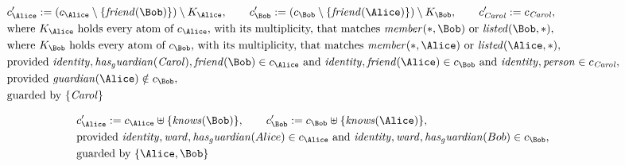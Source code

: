\begin{align*}
&
c'_
{
\Alice
}
 := 
(c_
{
\Alice
}
 \setminus 
\{
\mathit{
friend
}
(
\Bob
)
\}
) \setminus K_
{
\Alice
}
, \qquad 
c'_
{
\Bob
}
 := 
(c_
{
\Bob
}
 \setminus 
\{
\mathit{
friend
}
(
\Alice
)
\}
) \setminus K_
{
\Bob
}
, \qquad 
c'_
{
\mathit{Carol}
}
 := 
c_
{
\mathit{Carol}
}
,\\
&
\text{where } K_
{
\Alice
}
 \text{ holds every atom of } c_
{
\Alice
}
 \text{, with its multiplicity, that matches } 
\mathit{
member
}
(
\ast
,
\Bob
)
 \text{ or } 
\mathit{
listed
}
(
\Bob
,
\ast
)
,\\
&
\text{where } K_
{
\Bob
}
 \text{ holds every atom of } c_
{
\Bob
}
 \text{, with its multiplicity, that matches } 
\mathit{
member
}
(
\ast
,
\Alice
)
 \text{ or } 
\mathit{
listed
}
(
\Alice
,
\ast
)
,\\
&
\text{provided } 
\mathit{
identity
}
,
\mathit{
has_guardian
}
(
\mathit{Carol}
)
,
\mathit{
friend
}
(
\Bob
)
 \in c_
{
\Alice
}
 \text{ and } 
\mathit{
identity
}
,
\mathit{
friend
}
(
\Alice
)
 \in c_
{
\Bob
}
 \text{ and } 
\mathit{
identity
}
,
\mathit{
person
}
 \in c_
{
\mathit{Carol}
}
,\\
&
\text{provided } 
\mathit{
guardian
}
(
\Alice
)
 \notin c_
{
\Bob
}
,\\
&
\text{guarded by } \{
\mathit{Carol}
\}
\end{align*}

\begin{align*}
&
c'_
{
\Alice
}
 := 
c_
{
\Alice
}
 \uplus 
\{
\mathit{
knows
}
(
\Bob
)
\}
, \qquad 
c'_
{
\Bob
}
 := 
c_
{
\Bob
}
 \uplus 
\{
\mathit{
knows
}
(
\Alice
)
\}
,\\
&
\text{provided } 
\mathit{
identity
}
,
\mathit{
ward
}
,
\mathit{
has_guardian
}
(
Alice
)
 \in c_
{
\Alice
}
 \text{ and } 
\mathit{
identity
}
,
\mathit{
ward
}
,
\mathit{
has_guardian
}
(
Bob
)
 \in c_
{
\Bob
}
,\\
&
\text{guarded by } \{
\Alice
,
\Bob
\}
\end{align*}

